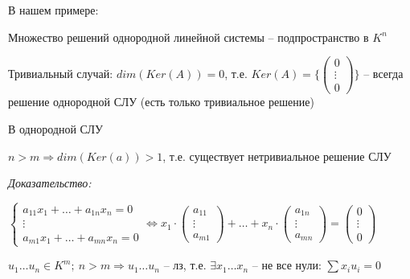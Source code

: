 \documentclass[12pt]{article}
\begin{document}
\begin{propos}{}
    В нашем примере:

    Множество решений однородной линейной системы -- подпространство в $K^n$

    Тривиальный случай: $dim(Ker(A)) = 0$, т.е. $Ker(A) = \{\left( \begin{gathered}
        0 \\
        \vdots \\
        0
    \end{gathered} \right) \}$ -- всегда решение однородной СЛУ (есть только тривиальное решение)
\end{propos}

\begin{theo}{}
    В однородной СЛУ

    $n > m \Rightarrow dim(Ker(a)) > 1$, т.е.  существует нетривиальное решение СЛУ
\end{theo}

\textit{Доказательство:}

$\begin{cases}
    a_{11}x_1 + \ldots + a_{1n}x_n = 0 \\
    \vdots \\
    a_{m1}x_1 + \ldots + a_{mn}x_n = 0
\end{cases} \Leftrightarrow x_1 \cdot \left( \begin{gathered}
    a_{11} \\
    \vdots \\
    a_{m1}
\end{gathered} \right) + \ldots + x_n \cdot \left( \begin{gathered}
    a_{1n} \\
    \vdots \\
    a_{mn}
\end{gathered} \right) = \left( \begin{gathered}
    0 \\
    \vdots \\
    0
\end{gathered} \right)$

$u_1 \ldots u_n \in K^m;\ n > m \Rightarrow u_1 \ldots u_n$ -- лз, т.е. $\exists x_1 \ldots x_n$ -- не все нули: $\sum x_iu_i = 0$
\end{document}
